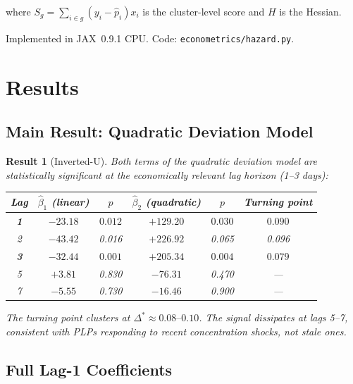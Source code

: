 \documentclass[11pt,a4paper]{article}
\newtheorem{result}{Result}
\begin{document}
where $S_g = \sum_{i \in g} (y_i - \hat p_i) x_i$ is the cluster-level
score and $H$ is the Hessian.

Implemented in JAX~0.9.1 CPU. Code: \texttt{econometrics/hazard.py}.


\section{Results}\label{sec:results}

\subsection{Main Result: Quadratic Deviation Model}

\begin{result}[Inverted-U]\label{res:quadratic}
Both terms of the quadratic deviation model are statistically significant at
the economically relevant lag horizon (1--3 days):

\begin{center}
\begin{tabular}{cccccc}
\toprule
Lag & $\hat\beta_1$ (linear) & $p$ & $\hat\beta_2$ (quadratic) & $p$ &
  Turning point \\
\midrule
\textbf{1} & $\mathbf{-23.18}$ & $\mathbf{0.012}$ & $\mathbf{+129.20}$ &
  $\mathbf{0.030}$ & $\mathbf{0.090}$ \\
2 & $-43.42$ & 0.016 & $+226.92$ & 0.065 & 0.096 \\
\textbf{3} & $\mathbf{-32.44}$ & $\mathbf{0.001}$ & $\mathbf{+205.34}$ &
  $\mathbf{0.004}$ & $\mathbf{0.079}$ \\
5 & $+3.81$ & 0.830 & $-76.31$ & 0.470 & --- \\
7 & $-5.55$ & 0.730 & $-16.46$ & 0.900 & --- \\
\bottomrule
\end{tabular}
\end{center}

The turning point clusters at $\Delta^* \approx 0.08\text{--}0.10$. The
signal dissipates at lags 5--7, consistent with PLPs responding to recent
concentration shocks, not stale ones.
\end{result}

\subsection{Full Lag-1 Coefficients}
\end{document}
